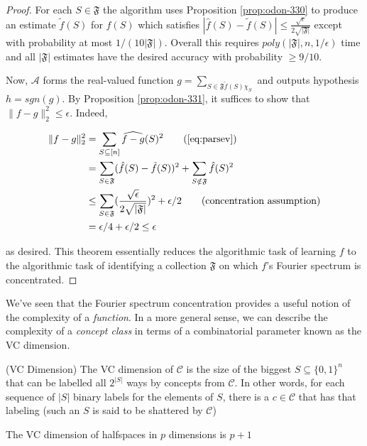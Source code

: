 \documentclass[main.tex]{subfiles}
\begin{document}
\begin{proof}
For each $S \in \mathfrak{F}$ the algorithm uses Proposition \ref{prop:odon-330} to produce an estimate $\tilde{f}(S)$ for $\hat{f}(S)$ which satisfies $|\hat{f}(S) - \tilde{f}(S) | \leq \frac{\sqrt{\epsilon}}{2 \sqrt{|\mathfrak{F}|}}$ except with probability at most $1/(10|\mathfrak{F}|)$. Overall this requires $poly(|\mathfrak{F}|, n, 1/\epsilon)$ time and all $|\mathfrak{F}|$ estimates have the desired accuracy with probability $\geq 9/10$. 

Now, $\mathcal{A}$ forms the real-valued function $g = \sum_{S \in \mathfrak{F} \tilde{f}(S) \chi_S}$ and outputs hypothesis $h = sgn(g)$. By Proposition \ref{prop:odon-331}, it suffices to show that $\| f - g\|_2^2 \leq \epsilon$. Indeed,

\begin{align*}
	\| f - g\|_2^2 &= \sum_{S \subseteq [n]}\widehat{f - g}(S)^2 \tag{\ref{eq:parsev}} \\
	&= \sum_{S \in \mathfrak{F}}(\hat{f}(S) - \tilde{f}(S))^2 + \sum_{S \notin \mathfrak{F}}\hat{f}(S)^2 \\
	&\leq \sum_{S \in \mathfrak{F}} (\frac{\sqrt{\epsilon}}{2\sqrt{|\mathfrak{F}|}})^2 + \epsilon /2 \tag{concentration assumption} \\
	&= \epsilon /4 + \epsilon/2 \leq \epsilon
\end{align*}

as desired. This theorem essentially reduces the algorithmic task of learning $f$ to the algorithmic task of identifying a collection $\mathfrak{F}$ on which $f$'s Fourier spectrum is concentrated. 
\end{proof}

We've seen that the Fourier spectrum concentration provides a useful notion of the complexity of a \textit{function}. In a more general sense, we can describe the complexity of a \textit{concept class} in terms of a combinatorial parameter known as the VC dimension.

\begin{definition}
(VC Dimension) The VC dimension of $\mathcal{C}$ is the size of the biggest $S \subseteq \{0, 1\}^n$ that can be labelled all $2^{|S|}$ ways by concepts from $\mathcal{C}$. In other words, for each sequence of $|S |$ binary labels for the elements of $S$, there is a $c \in \mathcal{C}$ that has that labeling (such an $S$ is said to be shattered by $\mathcal{C}$) 	
\end{definition}


\begin{example}
The VC dimension of halfspaces in $p$ dimensions is $p+1$	
\end{example}
\end{document}
